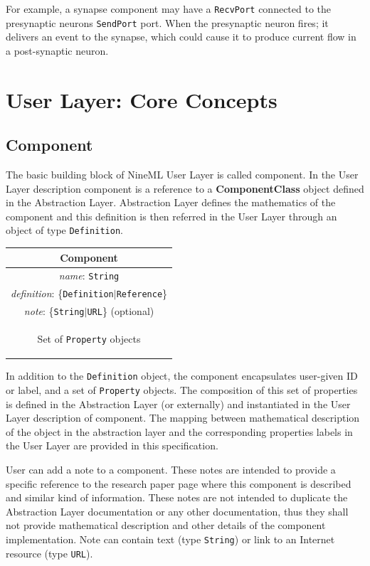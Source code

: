 \documentclass{article}
\newcommand{\ComponentClass}{{\bf{ComponentClass}}\xspace}
\newcommand{\SendPort}{{\tt{SendPort}}\xspace}
\newcommand{\RecvPort}{{\tt{RecvPort}}\xspace}
\begin{document}
For example, a synapse component may have a \RecvPort connected to the
presynaptic neurons \SendPort port. When the presynaptic neuron fires;
it delivers an event to the synapse, which could cause it to produce current
flow in a post-synaptic neuron.

\newpage

\section{User Layer: Core Concepts}
\label{UserL}

\subsection{Component}

The basic building block of NineML User Layer is called component. In the
User Layer description component is a reference to a \ComponentClass
object defined in the Abstraction Layer. Abstraction Layer defines the
mathematics of the component and this definition is then referred in the
User Layer through an object of type {\tt Definition}.

\begin{table}[htb]
\center
\begin{tabular}{|c|}
\hline
\hline
Component \\
\hline
\hline
{\em name}: {\tt String} \\
\hline
{\em definition}: \{{\tt Definition}$|${\tt Reference}\}\\
\hline
{\em note}: \{{\tt String}$|${\tt URL}\} (optional)\\
\hline
\colorbox{issuecolor}{\parbox{0.4\linewidth}
{\center Set of {\tt Property} objects}} \\
\hline
\end{tabular}
\end{table}

In addition to the {\tt Definition} object, the component encapsulates
user-given ID or label, and a set of {\tt Property} objects. The composition
of this set of properties is defined in the Abstraction Layer (or externally)
and instantiated in the User Layer description of component. The mapping
between mathematical description of the object in the abstraction
layer and the corresponding properties labels in the User Layer are
provided in this specification.

User can add a note to a component. These notes are intended to provide
a specific reference to the research paper page where this component is
described and similar kind of information. These notes are not intended
to duplicate the Abstraction Layer documentation or any other
documentation, thus they shall not provide mathematical description and
other details of the component implementation. Note can contain text
(type {\tt String}) or link to an Internet resource (type {\tt URL}).
\end{document}
